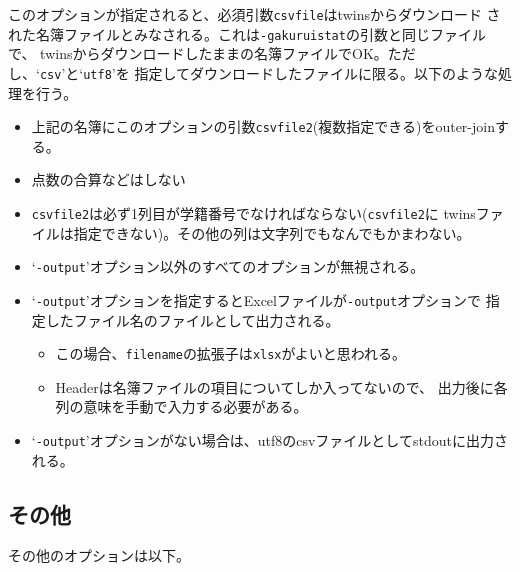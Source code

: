 このオプションが指定されると、必須引数\texttt{csvfile}はtwinsからダウンロード
された名簿ファイルとみなされる。これは\texttt{-gakuruistat}の引数と同じファイルで、
twinsからダウンロードしたままの名簿ファイルでOK。ただし、`\texttt{csv}'と`\texttt{utf8}'を
指定してダウンロードしたファイルに限る。以下のような処理を行う。

\begin{itemize}
\item 上記の名簿にこのオプションの引数\texttt{csvfile2}(複数指定できる)をouter-joinする。

\item 点数の合算などはしない

\item \texttt{csvfile2}は必ず1列目が学籍番号でなければならない(\texttt{csvfile2}に
twinsファイルは指定できない)。その他の列は文字列でもなんでもかまわない。

\item `\texttt{-output}'オプション以外のすべてのオプションが無視される。

\item `\texttt{-output}'オプションを指定するとExcelファイルが\texttt{-output}オプションで
指定したファイル名のファイルとして出力される。

\begin{itemize}
\item この場合、\texttt{filename}の拡張子は\texttt{xlsx}がよいと思われる。

\item Headerは名簿ファイルの項目についてしか入ってないので、
出力後に各列の意味を手動で入力する必要がある。

\end{itemize}

\item `\texttt{-output}'オプションがない場合は、utf8のcsvファイルとしてstdoutに出力される。

\end{itemize}

\subsection{その他}
\label{その他}

その他のオプションは以下。

